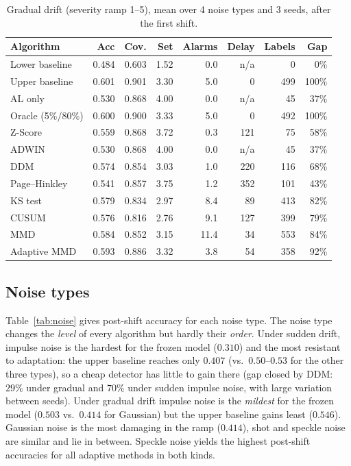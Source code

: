 \documentclass[11pt,a4paper]{article}
\begin{document}
\begin{table}[H]
\centering
\caption{Gradual drift (severity ramp 1--5), mean over 4 noise types and 3 seeds, after the first shift.}
\label{tab:gradual}
\small
\begin{tabular}{@{}lrrrrrrr@{}}
\toprule
Algorithm & Acc & Cov. & Set & Alarms & Delay & Labels & Gap \\
\midrule
Lower baseline & 0.484 & 0.603 & 1.52 & 0.0 & n/a & 0 & 0\% \\
Upper baseline & 0.601 & 0.901 & 3.30 & 5.0 & 0 & 499 & 100\% \\
AL only & 0.530 & 0.868 & 4.00 & 0.0 & n/a & 45 & 37\% \\
Oracle (5\%/80\%) & 0.600 & 0.900 & 3.33 & 5.0 & 0 & 492 & 100\% \\
Z-Score & 0.559 & 0.868 & 3.72 & 0.3 & 121 & 75 & 58\% \\
ADWIN & 0.530 & 0.868 & 4.00 & 0.0 & n/a & 45 & 37\% \\
DDM & 0.574 & 0.854 & 3.03 & 1.0 & 220 & 116 & 68\% \\
Page--Hinkley & 0.541 & 0.857 & 3.75 & 1.2 & 352 & 101 & 43\% \\
KS test & 0.579 & 0.834 & 2.97 & 8.4 & 89 & 413 & 82\% \\
CUSUM & 0.576 & 0.816 & 2.76 & 9.1 & 127 & 399 & 79\% \\
MMD & 0.584 & 0.852 & 3.15 & 11.4 & 34 & 553 & 84\% \\
Adaptive MMD & 0.593 & 0.886 & 3.32 & 3.8 & 54 & 358 & 92\% \\
\bottomrule
\end{tabular}
\end{table}

\subsection{Noise types}

Table~\ref{tab:noise} gives post-shift accuracy for each noise type. The noise type changes the \emph{level} of every algorithm but hardly their \emph{order}.
Under sudden drift, impulse noise is the hardest for the frozen model ($0.310$) and the most resistant to adaptation:
the upper baseline reaches only $0.407$ (vs.\ $0.50$--$0.53$ for the other three types), so a cheap detector
has little to gain there (gap closed by DDM: $29\%$ under gradual and $70\%$ under sudden impulse noise, with large variation between seeds). Under gradual drift impulse noise is the \emph{mildest} for the frozen model ($0.503$ vs.\ $0.414$ for Gaussian) but the upper baseline gains least ($0.546$).
Gaussian noise is the most damaging in the ramp ($0.414$), shot and speckle noise are similar and lie in between. Speckle noise yields the highest post-shift accuracies for all adaptive methods in both kinds.
\end{document}
